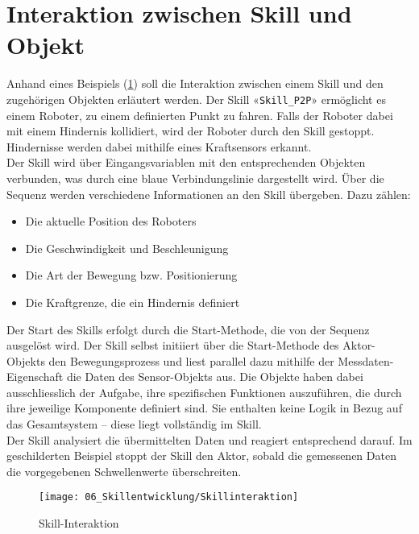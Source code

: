 \section{Interaktion zwischen Skill und Objekt} \label{SkillObjektInteraktion}
	Anhand eines Beispiels (\ref{fig:Skillinteraktion}) soll die Interaktion zwischen einem Skill und den zugehörigen Objekten erläutert werden. Der Skill «\verb|Skill_P2P|» ermöglicht es einem Roboter, zu einem definierten Punkt zu fahren. Falls der Roboter dabei mit einem Hindernis kollidiert, wird der Roboter durch den Skill gestoppt. Hindernisse werden dabei mithilfe eines Kraftsensors erkannt.
	\\
	Der Skill wird über Eingangsvariablen mit den entsprechenden Objekten verbunden, was durch eine blaue Verbindungslinie dargestellt wird. Über die Sequenz werden verschiedene Informationen an den Skill übergeben. Dazu zählen:
	\begin{itemize}
		\item Die aktuelle Position des Roboters
		\item Die Geschwindigkeit und Beschleunigung
		\item Die Art der Bewegung bzw. Positionierung
		\item Die Kraftgrenze, die ein Hindernis definiert
	\end{itemize}
	
	Der Start des Skills erfolgt durch die Start-Methode, die von der Sequenz ausgelöst wird. Der Skill selbst initiiert über die Start-Methode des Aktor-Objekts den Bewegungsprozess und liest parallel dazu mithilfe der Messdaten-Eigenschaft die Daten des Sensor-Objekts aus. Die Objekte haben dabei ausschliesslich der Aufgabe, ihre spezifischen Funktionen auszuführen, die durch ihre jeweilige Komponente definiert sind. Sie enthalten keine Logik in Bezug auf das Gesamtsystem – diese liegt vollständig im Skill.
	\\
	Der Skill analysiert die übermittelten Daten und reagiert entsprechend darauf. Im geschilderten Beispiel stoppt der Skill den Aktor, sobald die gemessenen Daten die vorgegebenen Schwellenwerte überschreiten.
	
	\begin{figure}[h!]
		\centering
		\texttt{[image: 06\_Skillentwicklung/Skillinteraktion]}
		\captionsetup{justification=centering}
		\caption{Skill-Interaktion}
		\label{fig:Skillinteraktion}
	\end{figure}
	
	\newpage
	
	
	